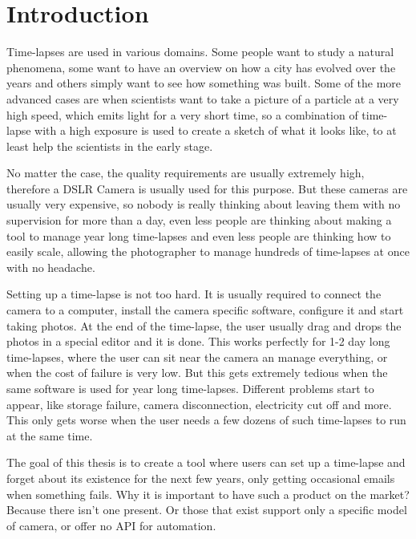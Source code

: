 \section*{Introduction}
\setcounter{page}{12}

Time-lapses are used in various domains. Some people want to study a natural phenomena, some want to have an overview on how a city has evolved over the years and others simply want to see how something was built. Some of the more advanced cases are when scientists want to take a picture of a particle at a very high speed, which emits light for a very short time, so a combination of time-lapse with a high exposure is used to create a sketch of what it looks like, to at least help the scientists in the early stage.

No matter the case, the quality requirements are usually extremely high, therefore a DSLR Camera is usually used for this purpose. But these cameras are usually very expensive, so nobody is really thinking about leaving them with no supervision for more than a day, even less people are thinking about making a tool to manage year long time-lapses and even less people are thinking how to easily scale, allowing the photographer to manage hundreds of time-lapses at once with no headache.

Setting up a time-lapse is not too hard. It is usually required to connect the camera to a computer, install the camera specific software, configure it and start taking photos. At the end of the time-lapse, the user usually drag and drops the photos in a special editor and it is done. This works perfectly for 1-2 day long time-lapses, where the user can sit near the camera an manage everything, or when the cost of failure is very low. But this gets extremely tedious when the same software is used for year long time-lapses. Different problems start to appear, like storage failure, camera disconnection, electricity cut off and more. This only gets worse when the user needs a few dozens of such time-lapses to run at the same time.

The goal of this thesis is to create a tool where users can set up a time-lapse and forget about its existence for the next few years, only getting occasional emails when something fails. Why it is important to have such a product on the market? Because there isn't one present. Or those that exist support only a specific model of camera, or offer no API for automation.

\clearpage